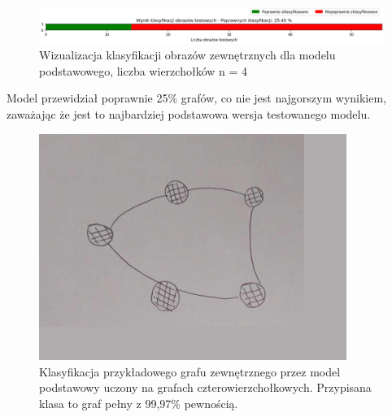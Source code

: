\begin{figure}[ht]
	\centering
	\includegraphics[width=14cm]{resources/tests/images/v3/base4_bar.png}
	\caption{Wizualizacja klasyfikacji obrazów zewnętrznych dla modelu podstawowego, liczba wierzchołków n = 4}
	\label{Fig:tests-base-1c}
\end{figure}
\FloatBarrier

Model przewidział poprawnie 25\% grafów, co nie jest najgorszym wynikiem,
zaważając że jest to najbardziej podstawowa wersja testowanego modelu.

\begin{figure}[ht]
	\centering
	\includegraphics[width=10cm]{../graph_classification/test_graphs/drawn/cycle-1.png}
	\caption{Klasyfikacja przykładowego grafu zewnętrznego przez model podstawowy uczony na grafach czterowierzchołkowych.
		Przypisana klasa to graf pełny z 99,97\% pewnością.}
	\label{Fig:tests-base-1d}
\end{figure}
\FloatBarrier




